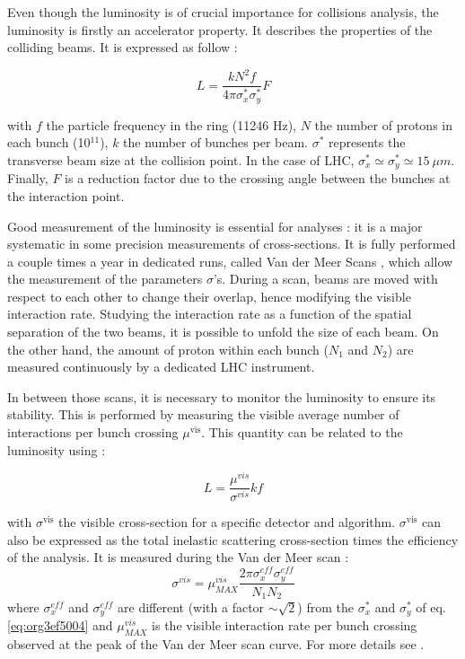 Even though the luminosity is of crucial importance for collisions analysis, the luminosity is firstly an accelerator property.
It describes the properties of the colliding beams.
It is expressed as follow :

\begin{equation}
\label{eq:org3ef5004}
L=\frac{kN^2f}{4\pi\sigma_x^*\sigma_y^*}F
\end{equation}

with \(f\) the particle frequency in the ring (11246 Hz), \(N\) the number of protons in each bunch (10\(^{\text{11}}\)), \(k\) the number of bunches per beam.
\(\sigma^*\) represents the transverse beam size at the collision point.
In the case of LHC, \(\sigma_x^*\simeq\sigma_y^*\simeq15\ \mu m\).
Finally, \(F\) is a reduction factor due to the crossing angle between the bunches at the interaction point.


Good measurement of the luminosity is essential for analyses : it is a major systematic in some precision measurements of cross-sections.
It is fully performed a couple times a year in dedicated runs, called Van der Meer Scans \cite{CERN-ISR-PO-68-31}, which allow the measurement of the parameters \(\sigma\)'s.
During a scan, beams are moved with respect to each other to change their overlap, hence modifying the visible interaction rate.
Studying the interaction rate as a function of the spatial separation of the two beams, it is possible to unfold the size of each beam.
On the other hand, the amount of proton within each bunch ($N_1$ and $N_2$) are measured continuously by a dedicated LHC instrument.

In between those scans, it is necessary to monitor the luminosity to ensure its stability.
This is performed by measuring the visible average number of interactions per bunch crossing \(\mu^{\text{vis}}\).
This quantity can be related to the luminosity using :

\begin{equation}
L = \frac{\mu^{vis}}{\sigma^{vis}} k f
\end{equation}

with \(\sigma^{\text{vis}}\) the visible cross-section for a specific detector and algorithm.
\(\sigma^{\text{vis}}\) can also be expressed as the total inelastic scattering cross-section times the efficiency of the analysis.
It is measured during the Van der Meer scan :
\begin{equation}
\sigma^{vis} = \mu^{vis}_{MAX} \frac{2\pi \sigma_x^{eff}\sigma_y^{eff}}{N_1N_2}
\end{equation}
where \(\sigma_x^{eff}\) and \(\sigma_y^{eff}\) are different (with a factor \(\sim\sqrt{2}\)) from the \(\sigma_x^*\) and \(\sigma_y^*\) of eq. \ref{eq:org3ef5004} and $\mu^{vis}_{MAX}$ is the visible interaction rate per bunch crossing observed at the peak of the Van der Meer scan curve.
For more details see \cite{CERN-THESIS-2010-139}.

